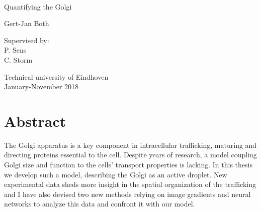 \documentclass{Dissertate}
\date{}
\begin{document}
\begin{titlepage}
​    \begin{center}

        
        \vspace*{2.5cm}
        
        \huge
        Quantifying the Golgi
        
        \vspace{1.5cm}
        
        \Large
        Gert-Jan Both
    
        \vspace{1.5cm}
    
        
        \vfill
        
        \normalsize
        Supervised by:\\
        P. Sens\\
        C. Storm
    
        \vspace{0.8cm}
    
        
        \normalsize
        Technical university of Eindhoven\\
        January-November 2018
    
    
    \end{center}
\end{titlepage}

\hypertarget{abstract}{%
\chapter*{Abstract}\label{abstract}}
 The Golgi apparatus is a key component in intracellular
trafficking, maturing and directing proteins essential to the cell.
Despite years of research, a model coupling Golgi size and function to
the cells' transport properties is lacking. In this thesis we develop
such a model, describing the Golgi as an active droplet. New
experimental data sheds more insight in the spatial organization of the
trafficking and I have also devised two new methods relying on image
gradients and neural networks to analyze this data and confront it with
our model.
\end{document}
